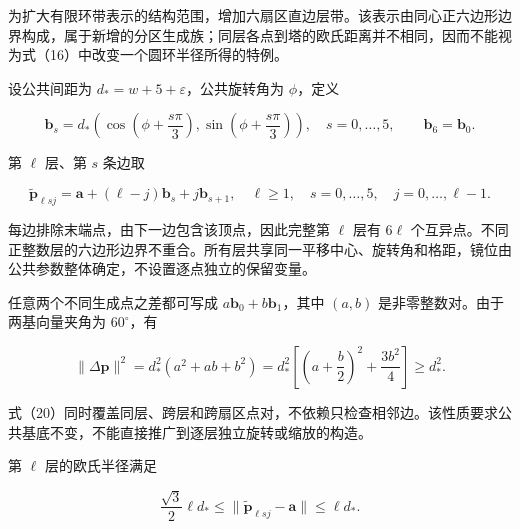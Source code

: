 \documentclass[UTF8,fontset=windows,zihao=-4]{ctexart}
\begin{document}
为扩大有限环带表示的结构范围，增加六扇区直边层带。该表示由同心正六边形边界构成，属于新增的分区生成族；同层各点到塔的欧氏距离并不相同，因而不能视为式（16）中改变一个圆环半径所得的特例。

\par\noindent\begin{minipage}{\linewidth}
设公共间距为 \(d_*=w+5+\varepsilon\)，公共旋转角为 \(\phi\)，定义

\[
\boldsymbol b_s=d_*
\left(\cos\left(\phi+\frac{s\pi}{3}\right),
\sin\left(\phi+\frac{s\pi}{3}\right)\right),
\quad s=0,\ldots,5,\qquad\boldsymbol b_6=\boldsymbol b_0.
\tag{18}
\]
\end{minipage}\par

\par\noindent\begin{minipage}{\linewidth}
第 \(\ell\) 层、第 \(s\) 条边取

\[
\widetilde{\boldsymbol p}_{\ell sj}
=\boldsymbol a+(\ell-j)\boldsymbol b_s+j\boldsymbol b_{s+1},
\quad \ell\ge1,\quad s=0,\ldots,5,\quad j=0,\ldots,\ell-1.
\tag{19}
\]
\end{minipage}\par

每边排除末端点，由下一边包含该顶点，因此完整第 \(\ell\) 层有 \(6\ell\) 个互异点。不同正整数层的六边形边界不重合。所有层共享同一平移中心、旋转角和格距，镜位由公共参数整体确定，不设置逐点独立的保留变量。

\par\noindent\begin{minipage}{\linewidth}
任意两个不同生成点之差都可写成 \(a\boldsymbol b_0+b\boldsymbol b_1\)，其中 \((a,b)\) 是非零整数对。由于两基向量夹角为 \(60^\circ\)，有

\[
\|\Delta\boldsymbol p\|^2
=d_*^2(a^2+ab+b^2)
=d_*^2\left[\left(a+\frac b2\right)^2+\frac{3b^2}{4}\right]
\ge d_*^2.
\tag{20}
\]
\end{minipage}\par

式（20）同时覆盖同层、跨层和跨扇区点对，不依赖只检查相邻边。该性质要求公共基底不变，不能直接推广到逐层独立旋转或缩放的构造。

\par\noindent\begin{minipage}{\linewidth}
第 \(\ell\) 层的欧氏半径满足

\[
\frac{\sqrt3}{2}\ell d_*
\le\|\widetilde{\boldsymbol p}_{\ell sj}-\boldsymbol a\|
\le\ell d_*.
\tag{21}
\]
\end{minipage}\par
\end{document}
